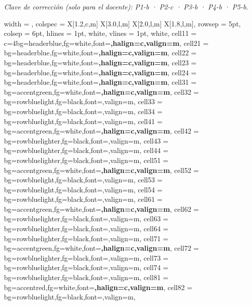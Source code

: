 \documentclass[a4paper,12pt]{article}
\begin{document}
\vspace{0.1cm}
\noindent\small\textit{Clave de corrección (solo para el docente): P1-b · P2-c · P3-b · P4-b · P5-b.}
\normalsize


{%
\begin{longtblr}{
    width   = \textwidth,
    colspec = {X[1.2,c,m] X[3.0,l,m] X[2.0,l,m] X[1.8,l,m]},
    rowsep  = 5pt,
    colsep  = 6pt,
    hlines  = {1pt, white},
    vlines  = {1pt, white},
    cell{1}{1} = {c=4}{bg=headerblue,fg=white,font=\large\bfseries,halign=c,valign=m},
    cell{2}{1} = {bg=headerblue,fg=white,font=\bfseries,halign=c,valign=m},
    cell{2}{2} = {bg=headerblue,fg=white,font=\bfseries,halign=c,valign=m},
    cell{2}{3} = {bg=headerblue,fg=white,font=\bfseries,halign=c,valign=m},
    cell{2}{4} = {bg=headerblue,fg=white,font=\bfseries,halign=c,valign=m},
    cell{3}{1} = {bg=accentgreen,fg=white,font=\bfseries,halign=c,valign=m},
    cell{3}{2} = {bg=rowbluelight,fg=black,font=\footnotesize,valign=m},
    cell{3}{3} = {bg=rowbluelight,fg=black,font=\footnotesize,valign=m},
    cell{3}{4} = {bg=rowbluelight,fg=black,font=\footnotesize,valign=m},
    cell{4}{1} = {bg=accentgreen,fg=white,font=\bfseries,halign=c,valign=m},
    cell{4}{2} = {bg=rowbluelighter,fg=black,font=\footnotesize,valign=m},
    cell{4}{3} = {bg=rowbluelighter,fg=black,font=\footnotesize,valign=m},
    cell{4}{4} = {bg=rowbluelighter,fg=black,font=\footnotesize,valign=m},
    cell{5}{1} = {bg=accentgreen,fg=white,font=\bfseries,halign=c,valign=m},
    cell{5}{2} = {bg=rowbluelight,fg=black,font=\footnotesize,valign=m},
    cell{5}{3} = {bg=rowbluelight,fg=black,font=\footnotesize,valign=m},
    cell{5}{4} = {bg=rowbluelight,fg=black,font=\footnotesize,valign=m},
    cell{6}{1} = {bg=accentgreen,fg=white,font=\bfseries,halign=c,valign=m},
    cell{6}{2} = {bg=rowbluelighter,fg=black,font=\footnotesize,valign=m},
    cell{6}{3} = {bg=rowbluelighter,fg=black,font=\footnotesize,valign=m},
    cell{6}{4} = {bg=rowbluelighter,fg=black,font=\footnotesize,valign=m},
    cell{7}{1} = {bg=accentgreen,fg=white,font=\bfseries,halign=c,valign=m},
    cell{7}{2} = {bg=rowbluelighter,fg=black,font=\footnotesize,valign=m},
    cell{7}{3} = {bg=rowbluelighter,fg=black,font=\footnotesize,valign=m},
    cell{7}{4} = {bg=rowbluelighter,fg=black,font=\footnotesize,valign=m},
    cell{8}{1} = {bg=accentred,fg=white,font=\bfseries,halign=c,valign=m},
    cell{8}{2} = {bg=rowbluelight,fg=black,font=\footnotesize,valign=m},
}
\end{longtblr}}
\end{document}
